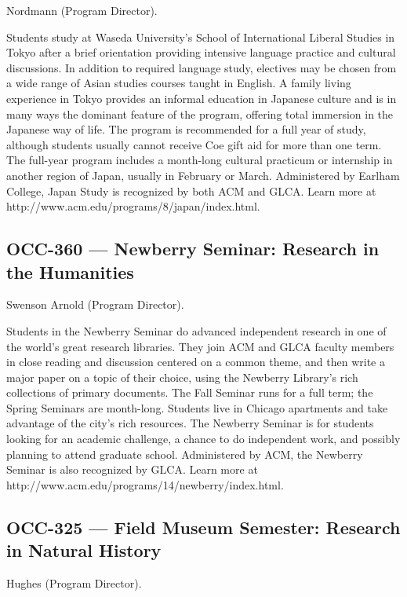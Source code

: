 \documentclass[
  letterpaper,
]{scrbook}
\begin{document}
Nordmann (Program Director).

Students study at Waseda University's School of International Liberal
Studies in Tokyo after a brief orientation providing intensive language
practice and cultural discussions. In addition to required language
study, electives may be chosen from a wide range of Asian studies
courses taught in English. A family living experience in Tokyo provides
an informal education in Japanese culture and is in many ways the
dominant feature of the program, offering total immersion in the
Japanese way of life. The program is recommended for a full year of
study, although students usually cannot receive Coe gift aid for more
than one term. The full-year program includes a month-long cultural
practicum or internship in another region of Japan, usually in February
or March. Administered by Earlham College, Japan Study is recognized by
both ACM and GLCA. Learn more at
http://www.acm.edu/programs/8/japan/index.html.

\subsection{OCC-360 --- Newberry Seminar: Research in the
Humanities}\label{occ-360-newberry-seminar-research-in-the-humanities}

Swenson Arnold (Program Director).

Students in the Newberry Seminar do advanced independent research in one
of the world's great research libraries. They join ACM and GLCA faculty
members in close reading and discussion centered on a common theme, and
then write a major paper on a topic of their choice, using the Newberry
Library's rich collections of primary documents. The Fall Seminar runs
for a full term; the Spring Seminars are month-long. Students live in
Chicago apartments and take advantage of the city's rich resources. The
Newberry Seminar is for students looking for an academic challenge, a
chance to do independent work, and possibly planning to attend graduate
school. Administered by ACM, the Newberry Seminar is also recognized by
GLCA. Learn more at http://www.acm.edu/programs/14/newberry/index.html.

\subsection{OCC-325 --- Field Museum Semester: Research in Natural
History}\label{occ-325-field-museum-semester-research-in-natural-history}

Hughes (Program Director).
\end{document}
